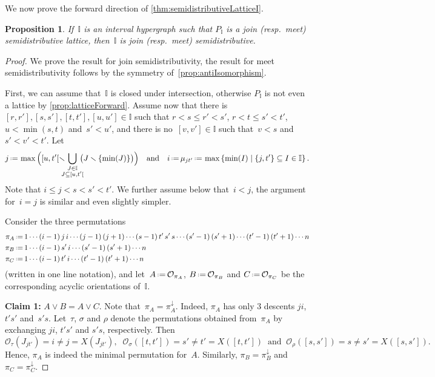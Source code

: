 \documentclass{amsart}
\newtheorem{proposition}[theorem]{Proposition}
\theoremstyle{definition}
\newcommand{\set}[2]{\left\{ #1 \;\middle|\; #2 \right\}} %
\newcommand{\ssm}{\smallsetminus} %
\newcommand{\eqdef}{\mbox{\,\raisebox{0.2ex}{\scriptsize\ensuremath{\mathrm:}}\ensuremath{=}\,}} %
\newcommand{\para}[1]{\medskip\noindent\textbf{#1}} %
\newcommand{\join}{\vee} %
\newcommand{\projDown}{\pi^\downarrow} %
\newcommand{\Or}{\mathcal O}  %
\newcommand{\II}{\mathbb I} %
\begin{document}
We now prove the forward direction of \cref{thm:semidistributiveLatticeI}.

\begin{proposition}
\label{prop:semidistributiveForward}
If~$\II$ is an interval hypergraph such that $P_\II$ is a join (resp.~meet) semidistributive lattice, then~$\II$ is join (resp.~meet) semidistributive.
\end{proposition}

\begin{proof}
We prove the result for join semidistributivity, the result for meet semidistributivity follows by the symmetry of~\cref{prop:antiIsomorphism}.

First, we can assume that~$\II$ is closed under intersection, otherwise $P_\II$ is not even a lattice by \cref{prop:latticeForward}.
Assume now that there is~$[r,r'], [s,s'], [t,t'], [u,u'] \in \II$ such that $r < s \le r' < s'$, $r < t \le s' < t'$, $u < \min(s, t)$ and~$s' < u'$, and there is no~$[v,v'] \in \II$ such that~$v < s$ and~${s' < v' < t'}$.
Let
\[
j \eqdef \max \Big( [u,t'[ \ssm \!\!\!\! \bigcup_{\substack{J \in \II \\ J \subseteq [u,t'[}} \!\!\!\! \big(J \ssm \{\min(J)\} \big)\Big)
\quad\text{and}\quad
i \eqdef \mu_{jt'} \eqdef \max\set{\min(I)}{\{j,t'\} \subseteq I \in \II}.
\]
Note that $i \le j < s < s' < t'$.
We further assume below that~$i < j$, the argument for~$i = j$ is similar and even slightly simpler.

Consider the three permutations
\begin{align*}
\pi_A & \eqdef 1 \cdots (i-1) \, j \, i \cdots (j-1) \, (j+1) \cdots (s-1) \, t' \, s' \, s \cdots (s'-1) \, (s'+1) \cdots (t'-1) \, (t'+1) \cdots n \\
\pi_B & \eqdef 1 \cdots (i-1) \, s' \, i \cdots (s'-1) \, (s'+1) \cdots n \\
\pi_C & \eqdef 1 \cdots (i-1) \, t' \, i \cdots (t'-1) \, (t'+1) \cdots n
\end{align*}
(written in one line notation), and let~$A \eqdef \Or_{\pi_A}$, $B \eqdef \Or_{\pi_B}$ and $C \eqdef \Or_{\pi_C}$ be the corresponding acyclic orientations of~$\II$.

\para{Claim 1:} $A \join B = A \join C$.
%
Note that~$\pi_A = \projDown_A$.
Indeed, $\pi_A$ has only $3$ descents $ji$, $t's'$ and~$s's$.
Let~$\tau$, $\sigma$ and $\rho$ denote the permutations obtained from~$\pi_A$ by exchanging $ji$, $t's'$ and $s's$, respectively.
Then
\[
\Or_{\tau}(J_{jt'}) = i \ne j = X(J_{jt'}),
\;\;
\Or_{\sigma}([t,t']) = s' \ne t' = X([t,t'])
\;\;\text{and}\;\;
\Or_{\rho}([s,s']) = s \ne s' = X([s,s']).
\]
Hence, $\pi_A$ is indeed the minimal permutation for~$A$.
Similarly, $\pi_B = \projDown_B$ and $\pi_C = \projDown_C$.


\end{proof}
\end{document}
